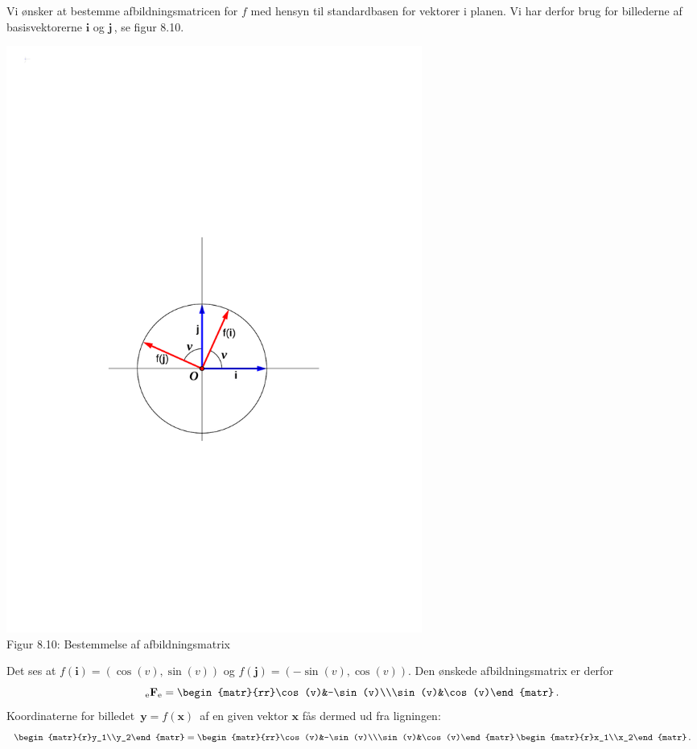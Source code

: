 \begin{example}
Vi ønsker at bestemme afbildningsmatricen for $f$ med hensyn til standardbasen for vektorer i planen. Vi har derfor brug for billederne af basisvektorerne $\mathbf i$ og $\mathbf j\,$, se figur 8.10.
\begin{center}
		\includegraphics[trim=2cm 9cm 2cm
 12cm,width=0.60\textwidth,clip]{drejning2.pdf}
  \\Figur 8.10: Bestemmelse af afbildningsmatrix 
\end{center}
Det ses at $ f(\mathbf i)=\left(\cos(v),\sin(v)\right) $ og $ f(\mathbf j)=\left(-\sin(v),\cos(v)\right)$. Den ønskede afbildningsmatrix er derfor
$$\matind eFe=\begin{matr}{rr}\cos(v)&-\sin(v)\\\sin(v)&\cos(v)\end{matr}\,.$$
Koordinaterne for billedet $\,\mathbf y=f(\mathbf x)\,$ af en given vektor $\mathbf x$ fås dermed ud fra ligningen:
$$
\begin{matr}{r}y_1\\y_2\end{matr}=
\begin{matr}{rr}\cos(v)&-\sin(v)\\\sin(v)&\cos(v)\end{matr}
\,\begin{matr}{r}x_1\\x_2\end{matr}\,.
$$
\end{example}

